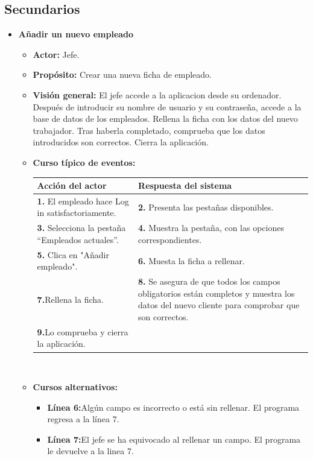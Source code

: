 \documentclass[spanish,a4paper,12pt]{report}		%
\begin{document}
\subsection{Secundarios}	
	\begin{itemize}


	\item \textbf{Añadir un nuevo empleado}		%
			\begin{itemize}
			\item \textbf{Actor:} Jefe.
			\item \textbf{Propósito: } Crear una nueva ficha de empleado.
			\item \textbf{Visión general:} El jefe accede a la aplicacion desde su ordenador. Después de introducir su nombre de usuario y su contraseña, accede a la base de datos de los empleados. Rellena la ficha con los datos del nuevo trabajador. Tras haberla completado, comprueba que los datos introducidos son correctos. Cierra la aplicación. 
			\item \textbf{Curso típico de eventos:} 	\\
				\begin{tabular}{|p{6cm}||p{6cm}|}
				\hline
				\textbf{Acción del actor} & \textbf{Respuesta del sistema} \\ \hline \hline
				\textbf{1.}   El empleado hace Log in satisfactoriamente. & \textbf{2.} Presenta las pestañas disponibles.\\ \hline
				\textbf{3.} Selecciona la pestaña “Empleados actuales”. & \textbf{4.} Muestra la pestaña, con las opciones correspondientes. \\ \hline
				\textbf{5.} Clica en "Añadir empleado".	& \textbf{6.} Muesta la ficha a rellenar. \\ \hline
				\textbf{7.}Rellena la ficha. & \textbf{8.} Se asegura de que todos los campos obligatorios están completos y muestra los datos del nuevo cliente para comprobar que son correctos.\\ \hline
				\textbf{9.}Lo comprueba y cierra la aplicación. & \textbf{} \\ \hline
			\end{tabular}
			\\
			\item \textbf{Cursos alternativos:} 
			\begin{itemize}
			\item  \textbf{Línea 6:}Algún campo es incorrecto o está sin rellenar. El programa regresa a la línea 7.
			\item  \textbf{Línea 7:}El jefe se ha equivocado al rellenar un campo. El programa le devuelve a la linea 7.
			\end {itemize}
		\end{itemize}%






\end{itemize}
\end{document}
